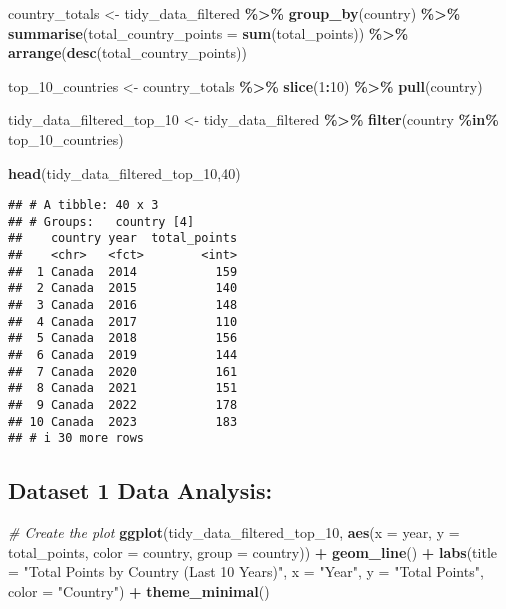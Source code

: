 \documentclass[
]{article}
\newenvironment{Shaded}{\begin{snugshade}}{\end{snugshade}}
\newcommand{\AttributeTok}[1]{\textcolor[rgb]{0.13,0.29,0.53}{#1}}
\newcommand{\CommentTok}[1]{\textcolor[rgb]{0.56,0.35,0.01}{\textit{#1}}}
\newcommand{\DecValTok}[1]{\textcolor[rgb]{0.00,0.00,0.81}{#1}}
\newcommand{\FunctionTok}[1]{\textcolor[rgb]{0.13,0.29,0.53}{\textbf{#1}}}
\newcommand{\NormalTok}[1]{#1}
\newcommand{\OtherTok}[1]{\textcolor[rgb]{0.56,0.35,0.01}{#1}}
\newcommand{\SpecialCharTok}[1]{\textcolor[rgb]{0.81,0.36,0.00}{\textbf{#1}}}
\newcommand{\StringTok}[1]{\textcolor[rgb]{0.31,0.60,0.02}{#1}}
\begin{document}
\begin{Shaded}
\begin{Highlighting}[]
\NormalTok{country\_totals }\OtherTok{\textless{}{-}}\NormalTok{ tidy\_data\_filtered }\SpecialCharTok{\%\textgreater{}\%}
  \FunctionTok{group\_by}\NormalTok{(country) }\SpecialCharTok{\%\textgreater{}\%}
  \FunctionTok{summarise}\NormalTok{(}\AttributeTok{total\_country\_points =} \FunctionTok{sum}\NormalTok{(total\_points)) }\SpecialCharTok{\%\textgreater{}\%}
  \FunctionTok{arrange}\NormalTok{(}\FunctionTok{desc}\NormalTok{(total\_country\_points))}

\NormalTok{top\_10\_countries }\OtherTok{\textless{}{-}}\NormalTok{ country\_totals }\SpecialCharTok{\%\textgreater{}\%}
  \FunctionTok{slice}\NormalTok{(}\DecValTok{1}\SpecialCharTok{:}\DecValTok{10}\NormalTok{) }\SpecialCharTok{\%\textgreater{}\%}
  \FunctionTok{pull}\NormalTok{(country)}

\NormalTok{tidy\_data\_filtered\_top\_10 }\OtherTok{\textless{}{-}}\NormalTok{ tidy\_data\_filtered }\SpecialCharTok{\%\textgreater{}\%}
  \FunctionTok{filter}\NormalTok{(country }\SpecialCharTok{\%in\%}\NormalTok{ top\_10\_countries)}

\FunctionTok{head}\NormalTok{(tidy\_data\_filtered\_top\_10,}\DecValTok{40}\NormalTok{)}
\end{Highlighting}
\end{Shaded}

\begin{verbatim}
## # A tibble: 40 x 3
## # Groups:   country [4]
##    country year  total_points
##    <chr>   <fct>        <int>
##  1 Canada  2014           159
##  2 Canada  2015           140
##  3 Canada  2016           148
##  4 Canada  2017           110
##  5 Canada  2018           156
##  6 Canada  2019           144
##  7 Canada  2020           161
##  8 Canada  2021           151
##  9 Canada  2022           178
## 10 Canada  2023           183
## # i 30 more rows
\end{verbatim}

\subsection{Dataset 1 Data Analysis:}\label{dataset-1-data-analysis}

\begin{Shaded}
\begin{Highlighting}[]
\CommentTok{\# Create the plot}
\FunctionTok{ggplot}\NormalTok{(tidy\_data\_filtered\_top\_10, }\FunctionTok{aes}\NormalTok{(}\AttributeTok{x =}\NormalTok{ year, }\AttributeTok{y =}\NormalTok{ total\_points, }\AttributeTok{color =}\NormalTok{ country, }\AttributeTok{group =}\NormalTok{ country)) }\SpecialCharTok{+}
  \FunctionTok{geom\_line}\NormalTok{() }\SpecialCharTok{+}
  \FunctionTok{labs}\NormalTok{(}\AttributeTok{title =} \StringTok{"Total Points by Country (Last 10 Years)"}\NormalTok{,}
       \AttributeTok{x =} \StringTok{"Year"}\NormalTok{,}
       \AttributeTok{y =} \StringTok{"Total Points"}\NormalTok{,}
       \AttributeTok{color =} \StringTok{"Country"}\NormalTok{) }\SpecialCharTok{+}
  \FunctionTok{theme\_minimal}\NormalTok{()}
\end{Highlighting}
\end{Shaded}
\end{document}
